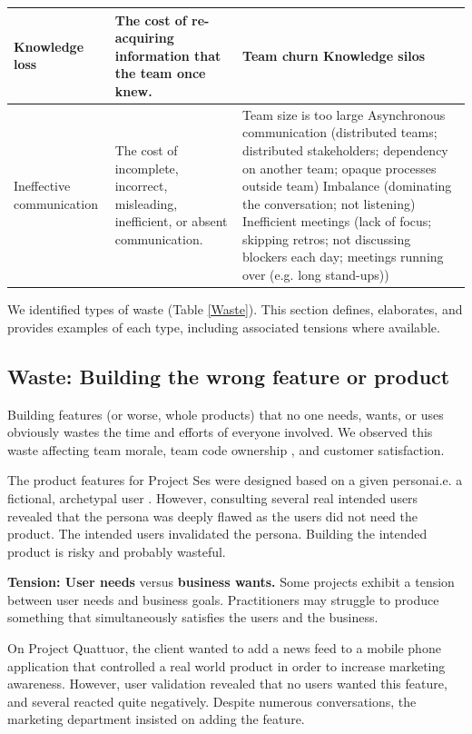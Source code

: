 \begin{table}[t]
\begin{tabular}{|p{1.5in}|p{1.9in}|p{3.2in}|}
Knowledge loss & The cost of re-acquiring information that the team once knew. & 
Team churn \newline
Knowledge silos 
\\ \hline
Ineffective communication             & The cost of incomplete, incorrect, misleading, inefficient, or absent communication.                         & 
Team size is too large \newline Asynchronous communication (distributed teams; distributed stakeholders; dependency on another team; opaque processes outside team) \newline Imbalance (dominating the conversation; not listening) \newline Inefficient meetings (lack of focus; skipping retros; not discussing blockers each day; meetings running over (e.g. long stand-ups)) \\ \hline                  
\end{tabular}
\end{table}




We identified \numberOfWastes{} types of waste (Table \ref{Waste}). This section defines, elaborates, and provides examples of each type, including associated tensions where available.
\subsection{Waste: Building the wrong feature or product}
Building features (or worse, whole products) that no one needs, wants, or uses obviously wastes the time and efforts of everyone involved. We observed this waste affecting team morale, team code ownership \cite{SedanoTeamCodeOwnership}, and customer satisfaction. 

The product features for Project Ses were designed based on a given persona\textemdash i.e. a fictional, archetypal user \cite{Grudin2002personas}. However, consulting several real intended users revealed that the persona was deeply flawed as the users did not need the product. The intended users invalidated the persona. Building the intended product is risky and probably wasteful. 

\textbf{Tension: User needs} versus \textbf{business wants.}
Some projects exhibit a tension between user needs and business goals. Practitioners may struggle to produce something that simultaneously satisfies the users and the business.

On Project Quattuor, the client wanted to add a news feed to a mobile phone application that controlled a real world product in order to increase marketing awareness. However, user validation revealed that no users wanted this feature, and several reacted quite negatively. Despite numerous conversations, the marketing department insisted on adding the feature. 
